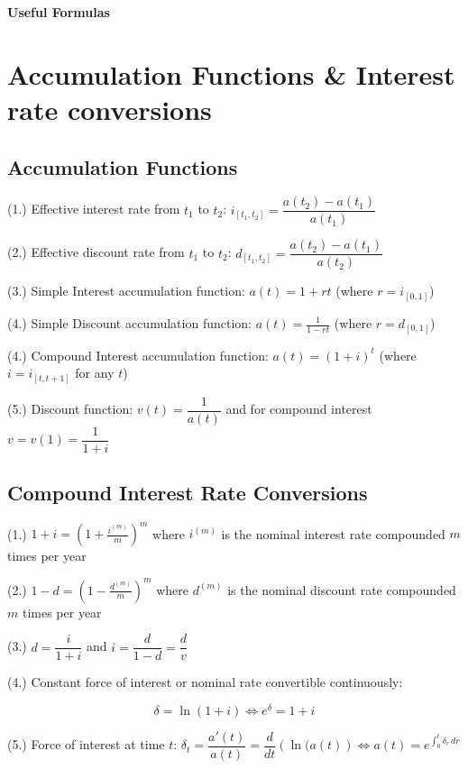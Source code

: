\documentclass[12pt]{article}
\begin{document}
\begin{center}
    \Large \textbf{Useful Formulas}
\end{center}

\section{Accumulation Functions \& Interest rate conversions}

\subsection{Accumulation Functions}

(1.) Effective interest rate from $t_1$ to $t_2$: $i_{[t_1,t_2]} = \dfrac{a(t_2)-a(t_1)}{a(t_1)}$

(2.) Effective discount rate from $t_1$ to $t_2$:  $d_{[t_1,t_2]} = \dfrac{a(t_2)-a(t_1)}{a(t_2)}$

(3.) Simple Interest accumulation function: $a(t) = 1+rt$ (where $r = i_{[0,1]}$)

(4.) Simple Discount accumulation function: $a(t) = \frac{1}{1-rt}$ (where $r = d_{[0,1]}$)

(4.) Compound Interest accumulation function: $a(t) = (1+i)^t$ (where $i = i_{[t,t+1]}$ for any $t$)

(5.) Discount function: $v(t)=\dfrac{1}{a(t)}$ and for compound interest $v = v(1)= \dfrac{1}{1+i}$

\subsection{Compound Interest Rate Conversions}

(1.) $1+i = \left(1+\frac{i^{(m)}}{m}\right)^m $ where $i^{(m)}$ is the nominal interest rate compounded $m$ times per year

(2.) $1-d = \left(1-\frac{d^{(m)}}{m}\right)^m $ where $d^{(m)}$ is the nominal discount rate compounded $m$ times per year

(3.) $d = \dfrac{i}{1+i}$ and $i = \dfrac{d}{1-d} = \dfrac{d}{v}$

(4.) Constant force of interest or nominal rate convertible continuously: 
\vspace{-.5cm}
    
    \[\delta = \ln(1+i) \iff e^{\delta}=1+i\]


(5.) Force of interest at time $t$: $\delta_t = \dfrac{a'(t)}{a(t)} = \dfrac{d}{dt}\left(\ln(a(t)\right) \iff a(t) = e^{\displaystyle \int_0^t \delta_r \, dr}$
\end{document}
